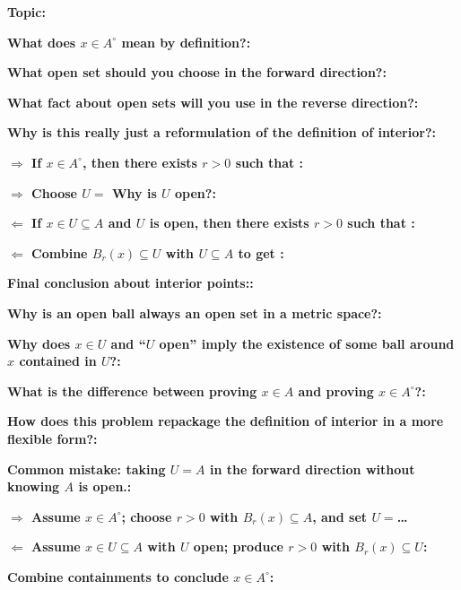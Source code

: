 \documentclass[12pt]{article}
\newcommand{\fillfield}[1]{%
  \par\noindent\textbf{#1:}\enspace\hrulefill\par\vspace{3pt}%
}
\newcommand{\writespace}[1]{\vspace{#1}}
\begin{document}
\bigskip

\begin{tcolorbox}[
  enhanced, breakable,
  colback  = pass1green,
  colframe = green!55!black,
  fonttitle = \bfseries,
  title = {Pass 1 \enspace\textbf{--}\enspace First Diagnosis}
]
\fillfield{Topic}
\fillfield{What does $x \in A^\circ$ mean by definition?}
\fillfield{What open set should you choose in the forward direction?}
\fillfield{What fact about open sets will you use in the reverse direction?}
\fillfield{Why is this really just a reformulation of the definition of interior?}
\end{tcolorbox}

\bigskip

\begin{tcolorbox}[
  enhanced, breakable,
  colback  = pass2yellow,
  colframe = yellow!65!black,
  fonttitle = \bfseries,
  title = {Pass 2 \enspace\textbf{--}\enspace Proof Recipe Card}
]
\fillfield{$\Longrightarrow$ If $x\in A^\circ$, then there exists $r>0$ such that \dotfill}
\fillfield{$\Longrightarrow$ Choose $U=$\hspace{1cm} Why is $U$ open?}
\fillfield{$\Longleftarrow$ If $x\in U\subseteq A$ and $U$ is open, then there exists $r>0$ such that \dotfill}
\fillfield{$\Longleftarrow$ Combine $B_r(x)\subseteq U$ with $U\subseteq A$ to get \dotfill}
\fillfield{Final conclusion about interior points:}
\end{tcolorbox}

\bigskip

\begin{tcolorbox}[
  enhanced, breakable,
  colback  = pass3orange,
  colframe = orange!65!black,
  fonttitle = \bfseries,
  title = {Pass 3 \enspace\textbf{--}\enspace Self-Explanation}
]
\fillfield{Why is an open ball always an open set in a metric space?}
\fillfield{Why does $x \in U$ and ``$U$ open'' imply the existence of some ball around $x$ contained in $U$?}
\fillfield{What is the difference between proving $x \in A$ and proving $x \in A^\circ$?}
\fillfield{How does this problem repackage the definition of interior in a more flexible form?}
\fillfield{Common mistake: taking $U=A$ in the forward direction without knowing $A$ is open.}
\end{tcolorbox}

\newpage

\begin{tcolorbox}[
  enhanced, breakable,
  colback  = pass4purple,
  colframe = purple!55!black,
  fonttitle = \bfseries,
  title = {Pass 4 \enspace\textbf{--}\enspace Skeleton Proof}
]
\noindent\textbf{$\Longrightarrow$ Assume $x\in A^\circ$; choose $r>0$ with $B_r(x)\subseteq A$, and set $U=$\ldots}\par
\writespace{1.5cm}
\noindent\textbf{$\Longleftarrow$ Assume $x\in U\subseteq A$ with $U$ open; produce $r>0$ with $B_r(x)\subseteq U$:}\par
\writespace{1.5cm}
\noindent\textbf{Combine containments to conclude $x\in A^\circ$:}\par
\writespace{1.0cm}
\end{tcolorbox}
\end{document}
